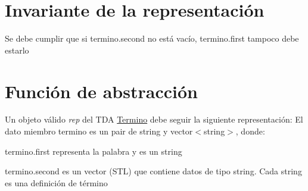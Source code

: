 \hypertarget{repTermino_invTermino}{}\section{Invariante de la representación}\label{repTermino_invTermino}
Se debe cumplir que si termino.\+second no está vacío, termino.\+first tampoco debe estarlo \hypertarget{repTermino_faTermino}{}\section{Función de abstracción}\label{repTermino_faTermino}
Un objeto válido {\itshape rep} del T\+DA \hyperlink{classTermino}{Termino} debe seguir la siguiente representación\+: El dato miembro termino es un pair de string y vector$<$string$>$, donde\+:
\begin{DoxyItemize}
\item termino.\+first representa la palabra y es un string
\item termino.\+second es un vector (S\+TL) que contiene datos de tipo string. Cada string es una definición de término 
\end{DoxyItemize}